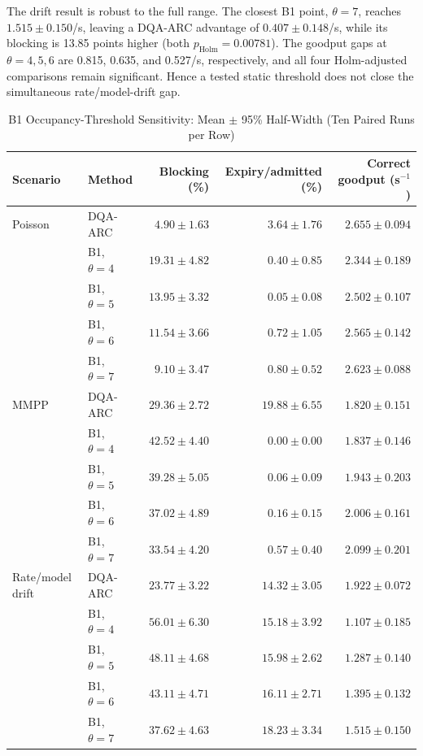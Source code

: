 \documentclass[journal]{IEEEtran}
\newcommand{\method}{DQA-ARC}
\begin{document}
The drift result is robust to the full range. The closest B1 point, $\theta=7$, reaches $1.515\pm0.150$/s, leaving a \method{} advantage of $0.407\pm0.148$/s, while its blocking is 13.85 points higher (both $p_{\mathrm{Holm}}=0.00781$). The goodput gaps at $\theta=4,5,6$ are 0.815, 0.635, and 0.527/s, respectively, and all four Holm-adjusted comparisons remain significant. Hence a tested static threshold does not close the simultaneous rate/model-drift gap.

\begin{table}[t]
\centering
\caption{B1 Occupancy-Threshold Sensitivity: Mean $\pm$ 95\% Half-Width (Ten Paired Runs per Row)}
\label{tab:threshold-sweep}
\small
\begin{tabular}{@{}llrrr@{}}
\toprule
Scenario & Method & Blocking (\%) & Expiry/admitted (\%) & Correct goodput (s$^{-1}$) \\
\midrule
Poisson & \method{} & $4.90\pm1.63$ & $3.64\pm1.76$ & $2.655\pm0.094$ \\
 & B1, $\theta=4$ & $19.31\pm4.82$ & $0.40\pm0.85$ & $2.344\pm0.189$ \\
 & B1, $\theta=5$ & $13.95\pm3.32$ & $0.05\pm0.08$ & $2.502\pm0.107$ \\
 & B1, $\theta=6$ & $11.54\pm3.66$ & $0.72\pm1.05$ & $2.565\pm0.142$ \\
 & B1, $\theta=7$ & $9.10\pm3.47$ & $0.80\pm0.52$ & $2.623\pm0.088$ \\
\midrule
MMPP & \method{} & $29.36\pm2.72$ & $19.88\pm6.55$ & $1.820\pm0.151$ \\
 & B1, $\theta=4$ & $42.52\pm4.40$ & $0.00\pm0.00$ & $1.837\pm0.146$ \\
 & B1, $\theta=5$ & $39.28\pm5.05$ & $0.06\pm0.09$ & $1.943\pm0.203$ \\
 & B1, $\theta=6$ & $37.02\pm4.89$ & $0.16\pm0.15$ & $2.006\pm0.161$ \\
 & B1, $\theta=7$ & $33.54\pm4.20$ & $0.57\pm0.40$ & $2.099\pm0.201$ \\
\midrule
Rate/model drift & \method{} & $23.77\pm3.22$ & $14.32\pm3.05$ & $1.922\pm0.072$ \\
 & B1, $\theta=4$ & $56.01\pm6.30$ & $15.18\pm3.92$ & $1.107\pm0.185$ \\
 & B1, $\theta=5$ & $48.11\pm4.68$ & $15.98\pm2.62$ & $1.287\pm0.140$ \\
 & B1, $\theta=6$ & $43.11\pm4.71$ & $16.11\pm2.71$ & $1.395\pm0.132$ \\
 & B1, $\theta=7$ & $37.62\pm4.63$ & $18.23\pm3.34$ & $1.515\pm0.150$ \\
\bottomrule
\end{tabular}
\end{table}
\end{document}
